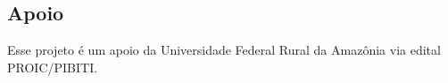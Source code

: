 \documentclass[a4paper, 12pt]{article}
\begin{document}


\newpage










\subsection*{Apoio}
Esse projeto é um apoio da Universidade Federal Rural da Amazônia via edital PROIC/PIBITI.



\end{document}

